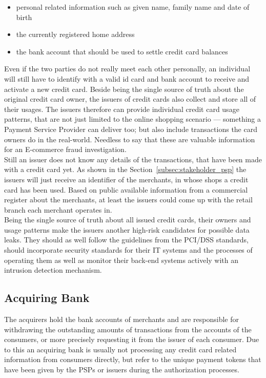 \begin{itemize}
		\item personal related information such as given name, family name and date of birth
		\item the currently registered home address
		\item the bank account that should be used to settle credit card balances
\end{itemize}

Even if the two parties do not really meet each other personally, an individual will still have to identify with a valid id card and bank account to receive and activate a new credit card. Beside being the single source of truth about the original credit card owner, the issuers of credit cards also collect and store all of their usages. The issuers therefore can provide individual credit card usage patterns, that are not just limited to the online shopping scenario --- something a Payment Service Provider can deliver too; but also include transactions the card owners do in the real-world. Needless to say that these are valuable information for an \gls{E-commerce} fraud investigation. \\

Still an issuer does not know any details of the transactions, that have been made with a credit card yet. As shown in the Section~\ref{subsec:stakeholder_psp} the issuers will just receive an identifier of the merchants, in whose shops a credit card has been used. Based on public available information from a commercial register about the merchants, at least the issuers could come up with the retail branch each merchant operates in. \\

Being the single source of truth about all issued credit cards, their owners and usage patterns make the issuers another high-risk candidates for possible data leaks. They should as well follow the guidelines from the \gls{PCI/DSS} standards, should incorporate security standards for their \gls{IT} systems and the processes of operating them as well as monitor their back-end systems actively with an intrusion detection mechanism.


\subsection{Acquiring Bank}
\label{subsec:stakeholder_acquirer}

The acquirers hold the bank accounts of merchants and are responsible for withdrawing the outstanding amounts of transactions from the accounts of the consumers, or more precisely requesting it from the issuer of each consumer. Due to this an acquiring bank is usually not processing any credit card related information from consumers directly, but refer to the unique payment tokens that have been given by the \gls{PSP}s or issuers during the authorization processes. \\

